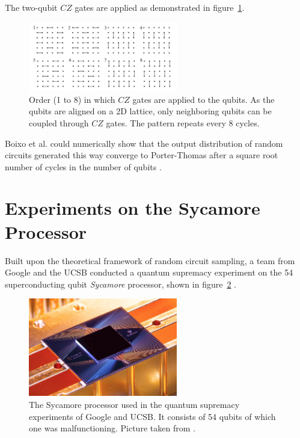 The two-qubit $CZ$ gates are applied as demonstrated in figure~\ref{fig:czgates}.

\begin{figure}[H]
  \centering
  \includegraphics[width=0.58\textwidth]{figures/cz_order}
  \caption[Order of $CZ$ Gate Applications in Random Circuits]{Order (1 to 8) in which $CZ$ gates are applied to the qubits. As 
  the qubits are aligned on a 2D lattice, only neighboring qubits can be coupled through $CZ$ gates. 
  The pattern repeats every 8 cycles.}
  \label{fig:czgates}
\end{figure}

Boixo et al. could numerically show that the output distribution of random circuits generated this way
converge to Porter-Thomas after a square root
number of cycles in the number of qubits \cite{Boixo2018supremacy}.

\section{Experiments on the Sycamore Processor}

Built upon the theoretical framework of random circuit sampling,
a team from Google and the UCSB conducted a quantum
supremacy experiment on the 54 superconducting qubit \textit{Sycamore}
processor, shown in figure~\ref{fig:sycamore} \cite{martines2019supremacy}.

\begin{figure}[H]
  \centering
  \includegraphics[width=0.58\textwidth]{figures/sycamore}
  \caption[The Sycamore processor]{The Sycamore processor used in the quantum supremacy experiments of Google and UCSB. It consists of 54 qubits of which one was malfunctioning. Picture taken from \cite{martines2019supremacy}.}
  \label{fig:sycamore}
\end{figure}

